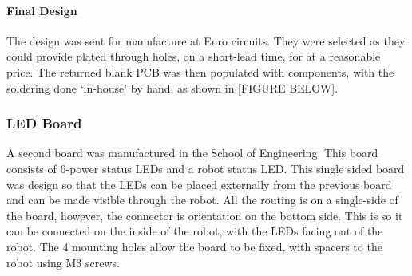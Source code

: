 \paragraph{Final Design}
The design was sent for manufacture at Euro circuits. They were selected as they could provide plated through holes, on a short-lead time, for at a reasonable price. The returned blank PCB was then populated with components, with the soldering done ‘in-house’ by hand, as shown in [FIGURE BELOW].\par


\subsubsection{LED Board}
A second board was manufactured in the School of Engineering. This board consists of 6-power status LEDs and a robot status LED. This single sided board was design so that the LEDs can be placed externally from the previous board and can be made visible through the robot. All the routing is on a single-side of the board, however, the connector is orientation on the bottom side. This is so it can be connected on the inside of the robot, with the LEDs facing out of the robot. The 4 mounting holes allow the board to be fixed, with spacers to the robot using M3 screws.\par


